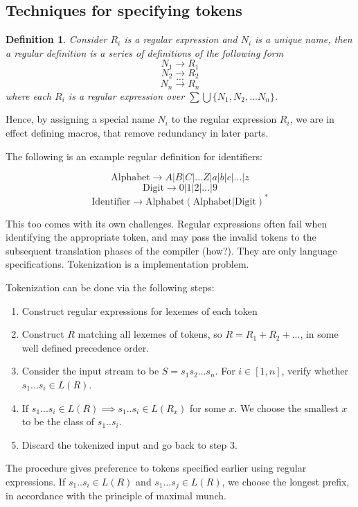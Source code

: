 \documentclass[12pt,letterpaper]{article}
\newtheorem{definition}{Definition}[section] %
\begin{document}
\subsection{Techniques for specifying tokens} 

\begin{definition}
  Consider $R_i$ is a regular expression and $N_i$ is a unique name, then a regular definition is a series of definitions of the following form 
  \[N_1 \rightarrow R_1 \]
  \[N_2 \rightarrow R_2 \]
  \[...\]
  \[N_n \rightarrow R_n \]
  where each $R_i$ is a regular expression over $\sum \bigcup \{N_1,N_2,...N_n\}$.
\end{definition}

Hence, by assigning a special name $N_i$ to the regular expression $R_i$, we are in effect defining macros, that remove redundancy in later parts.

The following is an example regular definition for identifiers:

\[\text{Alphabet} \rightarrow A|B|C|...Z|a|b|c|...|z\]
\[\text{Digit} \rightarrow 0|1|2|...|9\]
\[\text{Identifier} \rightarrow \text{Alphabet}(\text{Alphabet} | \text{Digit})^*\]

This too comes with its own challenges. Regular expressions often fail when identifying the appropriate token, and may pass the invalid tokens to the subsequent translation phases of the compiler (how?). They are only language specifications. Tokenization is a implementation problem.

Tokenization can be done via the following steps:

\begin{enumerate}
  \item Construct regular expressions for lexemes of each token
  \item Construct $R$ matching all lexemes of tokens, so $R = R_1+R_2+...$, in some well defined precedence order.
  \item Consider the input stream to be $S=s_1s_2...s_n$. For $i \in [1,n]$, verify whether $s_1...s_i \in L(R)$.
  \item If $s_1...s_i \in L(R) \implies s_1..s_i \in L(R_x)$ for some $x$. We choose the smallest $x$ to be the class of $s_1..s_i$. 
  \item Discard the tokenized input and go back to step 3.
\end{enumerate}

The procedure gives preference to tokens specified earlier using regular expressions. If $s_1..s_i \in L(R)$ and $s_1...s_j \in L(R)$, we choose the longest prefix, in accordance with the principle of maximal munch.
\end{document}
